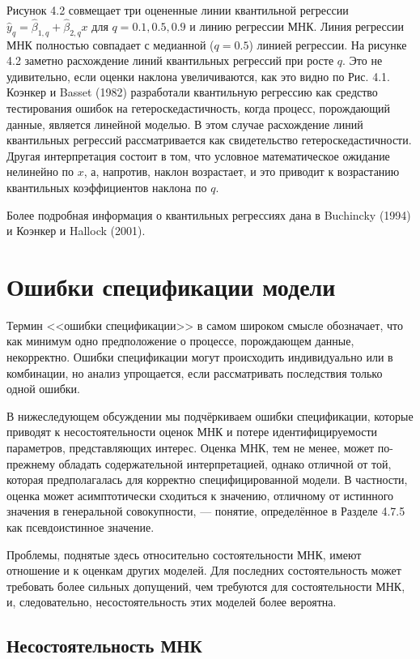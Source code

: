 Рисунок 4.2 совмещает три оцененные линии квантильной регрессии $\hat{y}_q = \hat{\beta}_{1,q}+\hat{\beta}_{2,q}x$ для $q=0.1, 0.5, 0.9$ и линию регрессии МНК. Линия регрессии МНК полностью совпадает с медианной ($q=0.5$) линией регрессии. На рисунке 4.2 заметно расхождение линий квантильных регрессий при росте $q$. Это не удивительно, если оценки наклона увеличиваются, как это видно по Рис. 4.1. Коэнкер и Basset (1982) разработали квантильную регрессию как средство тестирования ошибок на гетероскедастичность, когда процесс, порождающий данные, является линейной моделью. В этом случае расхождение линий квантильных регрессий рассматривается как свидетельство гетероскедастичности. Другая интерпретация состоит в том, что условное математическое ожидание нелинейно по $x$, а, напротив, наклон возрастает, и это приводит к возрастанию квантильных коэффициентов наклона по $q$.

Более подробная информация о квантильных регрессиях дана в Buchincky (1994) и Коэнкер и Hallock (2001).

\section{Ошибки спецификации модели}

Термин <<ошибки спецификации>> в самом широком смысле обозначает, что как минимум одно предположение о процессе, порождающем данные, некорректно. Ошибки спецификации могут происходить индивидуально или в комбинации, но анализ упрощается, если рассматривать последствия только одной ошибки.

В нижеследующем обсуждении мы подчёркиваем ошибки спецификации, которые приводят к несостоятельности оценок МНК и потере идентифицируемости параметров, представляющих интерес. Оценка МНК, тем не менее, может по-прежнему обладать содержательной интерпретацией, однако отличной от той, которая предполагалась для корректно специфицированной модели. В частности, оценка может асимптотически сходиться к значению, отличному от истинного значения в генеральной совокупности, --- понятие, определённое в Разделе 4.7.5 как псевдоистинное значение.

Проблемы, поднятые здесь относительно состоятельности МНК, имеют отношение и к оценкам других моделей. Для последних состоятельность может требовать более сильных допущений, чем требуются для состоятельности МНК, и, следовательно, несостоятельность этих моделей более вероятна. 

\subsection{Несостоятельность МНК}

